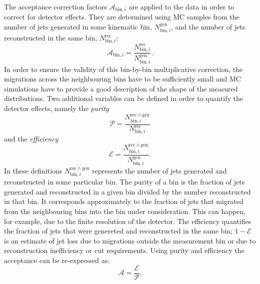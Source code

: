 The acceptance correction factors $\mathcal{A}_{\mathrm{bin},i}$ are applied to the data in order to correct for detector effects. They are determined using MC samples from the number of jets generated in some kinematic bin, $N_{\mathrm{bin},i}^{\mathrm{gen}}$, and the number of jets reconstructed in the same bin, $N_{\mathrm{bin},i}^{\mathrm{rec}}$:
\begin{equation}
 \mathcal{A}_{\mathrm{bin},i}=\frac{N_{\mathrm{bin},i}^{\mathrm{rec}}}{N_{\mathrm{bin},i}^{\mathrm{gen}}}.
 \label{eq:accdef}
\end{equation}
In order to ensure the validity of this bin-by-bin multiplicative correction, the migrations across the neighbouring bins have to be sufficiently small and MC simulations have to provide a good description of the shape of the measured distributions. Two additional variables can be defined in order to quantify the detector effects,  namely the \emph{purity}
\begin{equation}
 \mathcal{P}=\frac{N_{\mathrm{bin},i}^{\mathrm{rec \wedge gen}}}{N_{\mathrm{bin},i}^{\mathrm{rec}}}
\label{eq:puritydef}
\end{equation}
and the \emph{efficiency}
\begin{equation}
 \mathcal{E}=\frac{N_{\mathrm{bin},i}^{\mathrm{rec \wedge gen}}}{N_{\mathrm{bin},i}^{\mathrm{gen}}}.
\label{eq:efficiencydef}
\end{equation}
In these definitions $N_{\mathrm{bin},i}^{\mathrm{rec \wedge gen}}$ represents the number of jets generated and reconstructed in some particular bin. The purity of a bin is the fraction of jets generated and reconstructed in a given bin divided by the number reconstructed in that bin. It corresponds approximately to the fraction of jets that migrated from the neighbouring bins into the bin under consideration. This can happen, for example, due to the finite resolution of the detector. The efficiency quantifies the fraction of jets that were genereted and reconstructed in the same bin; $1-\mathcal{E}$ is an estimate of jet loss due to migrations outside the measurement bin or due to reconstruction inefficiency or cut requirements. Using purity and efficiency the acceptance can be re-expressed as:
\begin{equation}
  \mathcal{A}  = \frac{\mathcal{E}}{\mathcal{P}}.
\end{equation}

